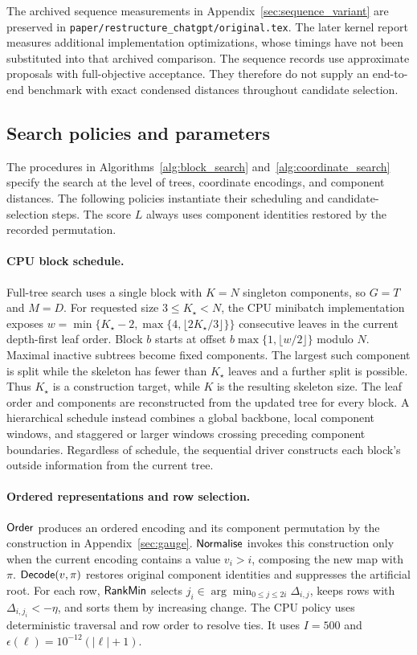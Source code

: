 The archived sequence measurements in Appendix~\ref{sec:sequence_variant} are preserved in
\nolinkurl{paper/restructure_chatgpt/original.tex}.
The later kernel report measures additional implementation optimizations, whose timings have not been substituted into that archived comparison.
The sequence records use approximate proposals with full-objective acceptance.
They therefore do not supply an end-to-end benchmark with exact condensed distances throughout candidate selection.

\subsection{Search policies and parameters}
\label{sec:search_policies}

The procedures in Algorithms~\ref{alg:block_search} and~\ref{alg:coordinate_search} specify the search at the level of trees, coordinate encodings, and component distances.
The following policies instantiate their scheduling and candidate-selection steps.
The score $L$ always uses component identities restored by the recorded permutation.

\paragraph{CPU block schedule.}
Full-tree search uses a single block with $K=N$ singleton components, so $G=T$ and $M=D$.
For requested size $3\leq K_\star<N$, the CPU minibatch implementation exposes
$w=\min\{K_\star-2,\max\{4,\lfloor2K_\star/3\rfloor\}\}$
consecutive leaves in the current depth-first leaf order.
Block $b$ starts at offset $b\max\{1,\lfloor w/2\rfloor\}$ modulo $N$.
Maximal inactive subtrees become fixed components.
The largest such component is split while the skeleton has fewer than $K_\star$ leaves and a further split is possible.
Thus $K_\star$ is a construction target, while $K$ is the resulting skeleton size.
The leaf order and components are reconstructed from the updated tree for every block.
A hierarchical schedule instead combines a global backbone, local component windows, and staggered or larger windows crossing preceding component boundaries.
Regardless of schedule, the sequential driver constructs each block's outside information from the current tree.

\paragraph{Ordered representations and row selection.}
$\mathsf{Order}$ produces an ordered encoding and its component permutation by the construction in Appendix~\ref{sec:gauge}.
$\mathsf{Normalise}$ invokes this construction only when the current encoding contains a value $v_i>i$, composing the new map with $\pi$.
$\mathsf{Decode}(v,\pi)$ restores original component identities and suppresses the artificial root.
For each row, $\mathsf{RankMin}$ selects
$j_i\in\arg\min_{0\leq j\leq2i}\Delta_{i,j}$,
keeps rows with $\Delta_{i,j_i}<-\eta$, and sorts them by increasing change.
The CPU policy uses deterministic traversal and row order to resolve ties.
It uses $I=500$ and $\epsilon(\ell)=10^{-12}(|\ell|+1)$.

